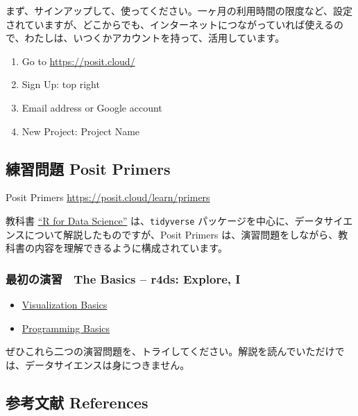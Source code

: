 \documentclass[
]{bxjsbook}
\providecommand{\tightlist}{%
  \setlength{\itemsep}{0pt}\setlength{\parskip}{0pt}}
\theoremstyle{definition}
\theoremstyle{definition}
\theoremstyle{definition}
\theoremstyle{definition}
\theoremstyle{remark}
\begin{document}
まず、サインアップして、使ってください。一ヶ月の利用時間の限度など、設定されていますが、どこからでも、インターネットにつながっていれば使えるので、わたしは、いつくかアカウントを持って、活用しています。

\begin{enumerate}
\def\labelenumi{\arabic{enumi}.}
\tightlist
\item
  Go to \url{https://posit.cloud/}
\item
  Sign Up: top right
\item
  Email address or Google account
\item
  New Project: Project Name
\end{enumerate}

\hypertarget{ux7df4ux7fd2ux554fux984c-posit-primers}{%
\subsection{練習問題 Posit Primers}\label{ux7df4ux7fd2ux554fux984c-posit-primers}}

Posit Primers \url{https://posit.cloud/learn/primers}

教科書 \href{https://r4ds.had.co.nz}{``R for Data Science''} は、\texttt{tidyverse} パッケージを中心に、データサイエンスについて解説したものですが、Posit Primers は、演習問題をしながら、教科書の内容を理解できるように構成されています。

\hypertarget{ux6700ux521dux306eux6f14ux7fd2-the-basics-r4ds-explore-i}{%
\subsubsection{最初の演習　The Basics -- r4ds: Explore, I}\label{ux6700ux521dux306eux6f14ux7fd2-the-basics-r4ds-explore-i}}

\begin{itemize}
\tightlist
\item
  \href{https://rstudio.cloud/learn/primers/1.1}{Visualization Basics}
\item
  \href{https://rstudio.cloud/learn/primers/1.2}{Programming Basics}
\end{itemize}

ぜひこれら二つの演習問題を、トライしてください。解説を読んでいただけでは、データサイエンスは身につきません。

\hypertarget{ux53c2ux8003ux6587ux732e-references}{%
\subsection{参考文献 References}\label{ux53c2ux8003ux6587ux732e-references}}
\end{document}
